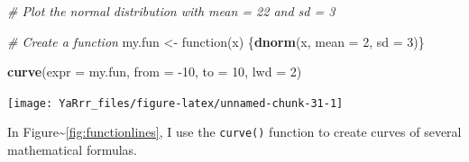 \documentclass[]{book}
\newenvironment{Shaded}{\begin{snugshade}}{\end{snugshade}}
\newcommand{\KeywordTok}[1]{\textcolor[rgb]{0.13,0.29,0.53}{\textbf{{#1}}}}
\newcommand{\DataTypeTok}[1]{\textcolor[rgb]{0.13,0.29,0.53}{{#1}}}
\newcommand{\DecValTok}[1]{\textcolor[rgb]{0.00,0.00,0.81}{{#1}}}
\newcommand{\StringTok}[1]{\textcolor[rgb]{0.31,0.60,0.02}{{#1}}}
\newcommand{\CommentTok}[1]{\textcolor[rgb]{0.56,0.35,0.01}{\textit{{#1}}}}
\newcommand{\NormalTok}[1]{{#1}}
\theoremstyle{definition}
\theoremstyle{definition}
\theoremstyle{remark}
\begin{document}
\begin{Shaded}
\begin{Highlighting}[]
\CommentTok{# Plot the normal distribution with mean = 22 and sd = 3}

\CommentTok{# Create a function}
\NormalTok{my.fun <-}\StringTok{ }\NormalTok{function(x) \{}\KeywordTok{dnorm}\NormalTok{(x, }\DataTypeTok{mean =} \DecValTok{2}\NormalTok{, }\DataTypeTok{sd =} \DecValTok{3}\NormalTok{)\}}

\KeywordTok{curve}\NormalTok{(}\DataTypeTok{expr =} \NormalTok{my.fun, }
      \DataTypeTok{from =} \NormalTok{-}\DecValTok{10}\NormalTok{, }
      \DataTypeTok{to =} \DecValTok{10}\NormalTok{, }\DataTypeTok{lwd =} \DecValTok{2}\NormalTok{)}
\end{Highlighting}
\end{Shaded}

\begin{center}\texttt{[image: YaRrr\_files/figure-latex/unnamed-chunk-31-1]} \end{center}

In Figure\textasciitilde{}\ref{fig:functionlines}, I use the
\texttt{curve()} function to create curves of several mathematical
formulas.
\end{document}
